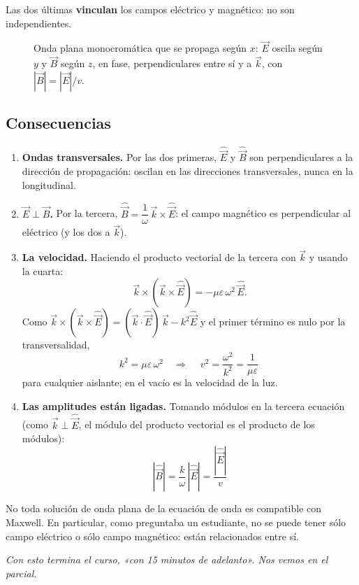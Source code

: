 \documentclass[12pt,a4paper]{article}
\begin{document}
Las dos últimas \textbf{vinculan} los campos eléctrico y magnético: no son
independientes.

\begin{figure}[H]
  \centering
  
  \caption{Onda plana monocromática que se propaga según $x$: $\vec E$ oscila según $y$ y $\vec B$ según $z$, en fase, perpendiculares entre sí y a $\vec k$, con $|\vec B| = |\vec E|/v$.}
\end{figure}

\subsection{Consecuencias}

\begin{enumerate}
  \item \textbf{Ondas transversales.} Por las dos primeras, $\hat{\vec E}$ y
  $\hat{\vec B}$ son perpendiculares a la dirección de propagación: oscilan en
  las direcciones transversales, nunca en la longitudinal.
  \item \textbf{$\vec E\perp\vec B$.} Por la tercera, $\hat{\vec B} = \dfrac{1}{\omega}\,\vec k\times\hat{\vec E}$:
  el campo magnético es perpendicular al eléctrico (y los dos a
  $\vec k$).
  \item \textbf{La velocidad.} Haciendo el producto vectorial de la tercera con
  $\vec k$ y usando la cuarta:
  \[
  \vec k\times(\vec k\times\hat{\vec E}) = -\mu\varepsilon\,\omega^2\,\hat{\vec E}.
  \]
  Como $\vec k\times(\vec k\times\hat{\vec E}) = (\vec k\cdot\hat{\vec E})\,\vec k - k^2\hat{\vec E}$
  y el primer término es nulo por la transversalidad,
  \[
  k^2 = \mu\varepsilon\,\omega^2
  \quad\Longrightarrow\quad
  \boxed{\ v^2 = \frac{\omega^2}{k^2} = \frac{1}{\mu\varepsilon}\ }
  \]
  para cualquier aislante; en el vacío es la velocidad de la luz.
  \item \textbf{Las amplitudes están ligadas.} Tomando módulos en la tercera ecuación
  (como $\vec k\perp\hat{\vec E}$, el módulo del producto vectorial es el
  producto de los módulos):
  \[
  \boxed{\ |\hat{\vec B}| = \frac{k}{\omega}\,|\hat{\vec E}| = \frac{|\hat{\vec E}|}{v}\ }
  \]
\end{enumerate}

No toda solución de onda plana de la ecuación de onda es compatible con
Maxwell. En particular, como preguntaba un estudiante, no se puede tener sólo
campo eléctrico o sólo campo magnético: están relacionados entre sí.

\noindent\emph{Con esto termina el curso, «con 15 minutos de adelanto». Nos vemos en el
parcial.}
\end{document}
